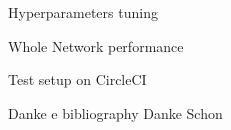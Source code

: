 \documentclass{beamer}
\begin{document}
\begin{frame}{Hyperparameters tuning}

    
\end{frame}


\begin{frame}{Whole Network performance}

    
\end{frame}

\begin{frame}{Test setup on CircleCI}

    
\end{frame}

\begin{frame}{Danke e bibliography}
\centering
Danke Schon

    
\end{frame}
\end{document}
